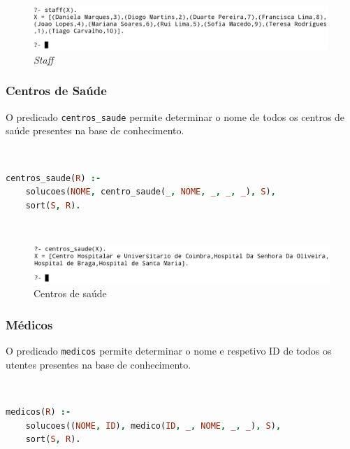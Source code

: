 \documentclass[a4paper, 11pt]{article}
\begin{document}
\

\begin{figure}[H]
    \centering
    \includegraphics[width=\textwidth]{img/staff.png}
    \caption{\textit{Staff}}
\end{figure}

\subsubsection{Centros de Saúde}

O predicado \texttt{centros\_saude} permite determinar o nome de todos os centros de saúde presentes na base
de conhecimento.

\

\begin{lstlisting}[language=Prolog, caption={Extensão do predicado \texttt{centros\_saude}}]
% Extensao do predicado centros_saude: R -> {V, F}
centros_saude(R) :- 
    solucoes(NOME, centro_saude(_, NOME, _, _, _), S),
    sort(S, R).
\end{lstlisting}

\

\begin{figure}[H]
    \centering
    \includegraphics[width=\textwidth]{img/centros_saude.png}
    \caption{Centros de saúde}
\end{figure}

\subsubsection{Médicos}

O predicado \texttt{medicos} permite determinar o nome e respetivo ID de todos os utentes presentes na base
de conhecimento.

\

\begin{lstlisting}[language=Prolog, caption={Extensão do predicado \texttt{medicos}}]
% Extensao do predicado medicos: R -> {V, F}
medicos(R) :- 
    solucoes((NOME, ID), medico(ID, _, NOME, _, _), S),
    sort(S, R).
\end{lstlisting}
\end{document}

